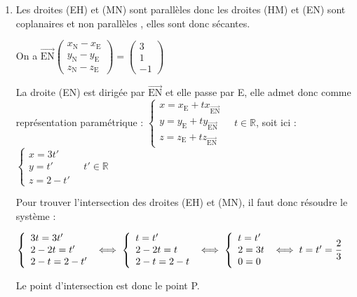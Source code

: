 \documentclass[10pt]{article}
\providecommand{\degres}{\ensuremath{^\circ}}
\providecommand{\R}{\mathbb{R}}
\providecommand{\vect}[1]{\overrightarrow{#1}}
\providecommand{\degres}{{^\circ}}
\begin{document}
\begin{enumerate}
\begin{enumerate}
On a donc $\dfrac{8}{9}=\dfrac{\sqrt{14}}{3}\times \dfrac{\sqrt{11}}{3}\times \cos \left( \widehat{MPN} \right)$.

d'où $\cos \left( \widehat{MPN} \right) = \dfrac{8}{\sqrt{11}\sqrt{14}}$ soit $\widehat{MPN}\approx 50\degres$.

L'angle ne dépasse pas $55 \degres$, le toit peut donc être construit.
	\end{enumerate}
\item 	Les droites (EH) et (MN) sont parallèles donc les droites (HM) et (EN) sont coplanaires et non parallèles , elles sont donc sécantes.

On a  $\vect{\mathrm{EN}}\begin{pmatrix} x_\mathrm{N}-x_\mathrm{E}\\y_\mathrm{N}-y_\mathrm{E}\\z_\mathrm{N}-z_\mathrm{E} \end{pmatrix} = \begin{pmatrix} 3\\1\\-1\end{pmatrix}$

La droite (EN) est dirigée par $\vect{\mathrm{EN}}$ et elle passe par E, elle admet donc comme représentation paramétrique : $ \left\{\begin{array}{l} x=x_\mathrm{E} + tx_{\vect{\mathrm{EN}}}\\y=y_\mathrm{E} + ty_{\vect{\mathrm{EN}}}\\z=z_\mathrm{E} + tz_{\vect{\mathrm{EN}}} \end{array}\right. \quad t \in \R $, soit ici : $ \left\{\begin{array}{l} x=3t'\\y= t'\\z=2-t' \end{array}\right. \quad t'\in \R $

Pour trouver l'intersection des droites (EH) et (MN), il faut donc résoudre le système :

$\left\{\begin{array}{l}
3t	=3t'\\
2-2t 	=t'\\
2-t	=2-t'\\
\end{array}\right. \iff \left\{\begin{array}{l c l}
t=t'\\
2-2t=t\\
2-t=2-t\\
\end{array}\right.\iff \left\{\begin{array}{l c l}
t=t'\\
2=3t\\
0=0\\
\end{array}\right.\iff t=t'=\dfrac{2}{3}$

Le point d'intersection est donc le point P.
\end{enumerate}

\bigskip
\end{document}
